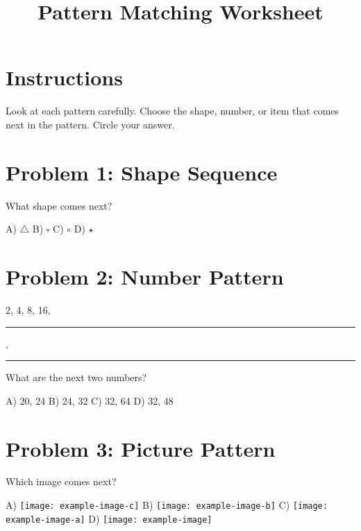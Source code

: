 \documentclass[12pt]{article}
\title{Pattern Matching Worksheet}
\author{}
\date{}
\begin{document}
\maketitle

\section*{Instructions}
Look at each pattern carefully. Choose the shape, number, or item that comes next in the pattern. Circle your answer.

\section*{Problem 1: Shape Sequence}
\begin{center}
\end{center}
What shape comes next?

\vspace{1em}
\noindent A) $\triangle$ \quad B) $\square$ \quad C) $\circ$ \quad D) $\star$

\section*{Problem 2: Number Pattern}
2, 4, 8, 16, \rule{1cm}{0.15mm}, \rule{1cm}{0.15mm}

\vspace{1em}
\noindent What are the next two numbers?

\vspace{1em}
\noindent A) 20, 24 \quad B) 24, 32 \quad C) 32, 64 \quad D) 32, 48

\section*{Problem 3: Picture Pattern}
\begin{center}
\end{center}
Which image comes next?

\vspace{1em}
\noindent A) \texttt{[image: example-image-c]} \quad B) \texttt{[image: example-image-b]} \quad C) \texttt{[image: example-image-a]} \quad D) \texttt{[image: example-image]}
\end{document}

